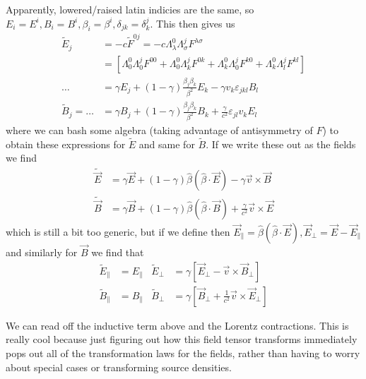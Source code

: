 \documentclass[10pt]{report}
\begin{document}
Apparently, lowered/raised latin indicies are the same, so $E_i = E^i, B_i=B^i, \beta_i = \beta^i, \delta_{jk} = \delta^j_k$. This then gives us
\begin{align}
    \tilde{E}_j &= -c\tilde{F}^{0j} = -c\Lambda^0_\lambda \Lambda^j_\sigma F^{\lambda\sigma}\\
    &= \left[ \Lambda^0_0\Lambda^j_0F^{00} + \Lambda^0_0\Lambda^j_kF^{0k} + \Lambda^0_k\Lambda^j_0 F^{k0}+ \Lambda^0_k \Lambda^j_l F^{kl} \right]\\
    \dots &= \gamma E_j + \left( 1-\gamma \right)\frac{\beta_j\beta_k}{\beta^2}E_k - \gamma v_k\varepsilon_{jkl}B_l\\
    \tilde{B}_j =\dots &= \gamma B_j + \left( 1-\gamma \right)\frac{\beta_j\beta_k}{\beta^2}B_k + \frac{\gamma}{c^2}\varepsilon_{jl}v_kE_l
\end{align}
where we can bash some algebra (taking advantage of antisymmetry of $F$) to obtain these expressions for $\tilde{E}$ and same for $\tilde{B}$. If we write these out as the fields we find
\begin{align}
    \tilde{\vec{E}} &= \gamma \vec{E} + \left( 1 - \gamma \right)\hat{\beta}\left( \hat{\beta} \cdot \vec{E} \right) - \gamma\vec{v} \times \vec{B}\\
    \tilde{\vec{B}} &= \gamma \vec{B} + \left( 1-\gamma \right)\hat{\beta}\left( \hat{\beta} \cdot \vec{B} \right) + \frac{\gamma}{c^2}\vec{v} \times \vec{E}
\end{align}
which is still a bit too generic, but if we define then $\vec{E}_{\parallel} = \hat{\beta}(\hat{\beta} \cdot \vec{E}), \vec{E}_{\perp} = \vec{E} - \vec{E}_{\parallel}$ and similarly for $\vec{B}$ we find that
\begin{align}
    \tilde{E}_{\parallel} &= E_{\parallel} & \tilde{E}_\perp &= \gamma\left[ \vec{E}_{\perp} - \vec{v} \times \vec{B}_\perp \right]\\
    \tilde{B}_{\parallel} &= B_{\parallel} & \tilde{B}_\perp &= \gamma\left[ \vec{B}_\perp + \frac{1}{c^2} \vec{v} \times \vec{E}_\perp\right]
\end{align}

We can read off the inductive term above and the Lorentz contractions. This is really cool because just figuring out how this field tensor transforms immediately pops out all of the transformation laws for the fields, rather than having to worry about special cases or transforming source densities.
\end{document}
